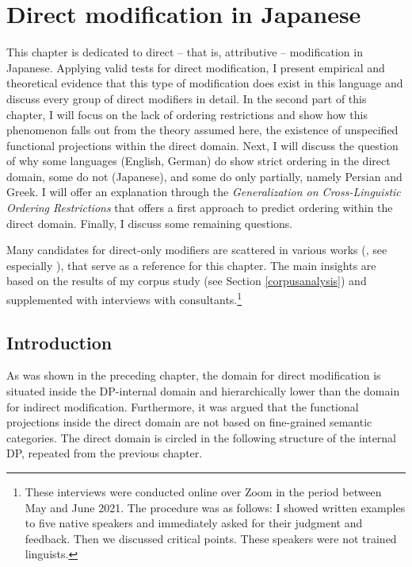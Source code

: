 \chapter{Direct modification in Japanese} \label{direct japanese}

This chapter is dedicated to direct -- that is, attributive -- modification in Japanese. Applying valid tests for direct modification, I present empirical and theoretical evidence that this type of modification does exist in this language and discuss every group of direct modifiers in detail. In the second part of this chapter, I will focus on the lack of ordering restrictions and show how this phenomenon falls out from the theory assumed here, the existence of unspecified functional projections within the direct domain. Next, I will discuss the question of why some languages (English, German) do show strict ordering in the direct domain, some do not (Japanese), and some do only partially, namely Persian and Greek. I will offer an explanation through the \textit{Generalization on Cross-Linguistic Ordering Restrictions} that offers a first approach to predict ordering within the direct domain. Finally, I discuss some remaining questions.

Many candidates for direct-only modifiers are scattered in various works (\citealt{yamakido:2000:japanese, yamakido:2005:nature, yamakido:2007:nature, ayano:2010:revisiting, watanabe:2012:direct, morita:2010:internal, morita:2011:three, morita:2013:morph, nagano:2015:RA, nagano:2016:are}, see especially \citealt{watanabe:2017:attributive, muraki:1996:imi, muraki:2009:nihongo, muraki:2012:nihongo}), that serve as a reference for this chapter. The main insights are based on the results of my corpus study (see Section \ref{corpusanalysis}) and supplemented with interviews with consultants.\footnote{These interviews were conducted online over Zoom in the period between May and June 2021. The procedure was as follows: I showed written examples to five native speakers and immediately asked for their judgment and feedback. Then we discussed critical points. These speakers were not trained linguists.}

\section{Introduction}

As was shown in the preceding chapter, the domain for direct modification is situated inside the DP-internal domain and hierarchically lower than the domain for indirect modification. Furthermore, it was argued that the functional projections inside the direct domain are not based on fine-grained semantic categories. The direct domain is circled in the following structure of the internal DP, repeated from the previous chapter.

